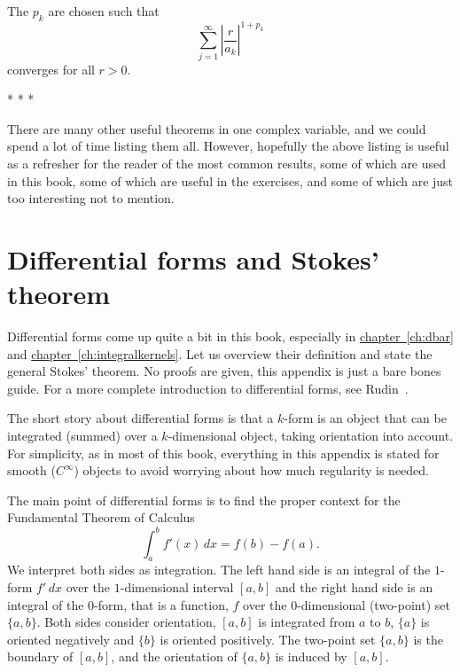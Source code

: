 \documentclass[12pt,openany]{book}
\newcommand{\abs}[1]{\left\lvert {#1} \right\rvert}
\theoremstyle{plain}
\theoremstyle{remark}
\theoremstyle{definition}
\theoremstyle{exercise}
\theoremstyle{example}
\newcommand{\chapterref}[1]{\hyperref[#1]{chapter~\ref*{#1}}}
\begin{document}
The $p_k$ are chosen such that
\begin{equation*}
\sum_{j=1}^\infty {\abs{\frac{r}{a_k}}}^{1+p_k}
\end{equation*}
converges for all $r > 0$.

\begin{center}
* * *
\end{center}

There are many other useful theorems in one complex variable, and we could
spend a lot of time listing them all.
However, hopefully the above listing is useful
as a refresher for the reader of the most common results, some of which are
used in this book, some of which are useful in the exercises, and some of
which are just too interesting not to mention.



\chapter{Differential forms and Stokes' theorem} \label{ap:diffforms}


Differential forms come up quite a bit in this book, especially
in \chapterref{ch:dbar} and \chapterref{ch:integralkernels}.
Let us overview their definition
and state the general Stokes' theorem.  No proofs are given, this appendix
is just a bare bones guide.
For a more complete introduction to differential forms,
see Rudin~\cite{Rudin:principles}.

The short story about differential forms is that a $k$-form is an object
that can be integrated (summed) over a $k$-dimensional object,
taking orientation into account.
For simplicity, as in most of this book,
everything in this appendix is stated for smooth
($C^\infty$) objects to avoid worrying about how much regularity is needed.

The main point of differential forms is to find the proper context for the
Fundamental Theorem of Calculus
\begin{equation*}
\int_a^b f'(x) \, dx = f(b)-f(a) .
\end{equation*}
We interpret both sides as integration.  The left hand side is an integral
of the $1$-form $f'\, dx$ over the $1$-dimensional interval $[a,b]$
and the right hand side is an integral of the $0$-form, that is a  function,
$f$ over the $0$-dimensional (two-point) set $\{ a, b \}$.  Both sides
consider orientation, $[a,b]$ is integrated from $a$ to $b$,
$\{a\}$ is oriented negatively and 
$\{b\}$ is oriented positively.  The two-point set
$\{a,b\}$ is the boundary of $[a,b]$, and the orientation of $\{ a,b \}$
is induced by $[a,b]$.
\end{document}
